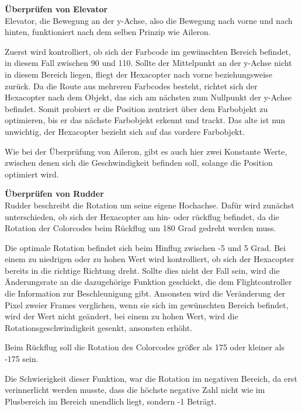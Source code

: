     \textbf{Überprüfen von Elevator}\\
    Elevator, die Bewegung an der y-Achse, also die Bewegung nach vorne und nach hinten, funktioniert nach dem selben Prinzip wie Aileron. 

    Zuerst wird kontrolliert, ob sich der Farbcode im gewünschten Bereich befindet, in diesem Fall zwischen 90 und 110.
    Sollte der Mittelpunkt an der y-Achse nicht in diesem Bereich liegen, fliegt der Hexacopter nach vorne beziehungsweise zurück.
    Da die Route aus mehreren Farbcodes besteht, richtet sich der Hexacopter nach dem Objekt, das sich am nächsten zum Nullpunkt der y-Achse befindet. Somit probiert er die Position zentriert über dem Farbobjekt zu optimieren, bis er das nächste Farbobjekt erkennt und trackt. Das alte ist nun unwichtig, der Hexacopter bezieht sich auf das vordere Farbobjekt.

    Wie bei der Überprüfung von Aileron, gibt es auch hier zwei Konstante Werte, zwischen denen sich die Geschwindigkeit befinden soll, solange die Position optimiert wird.

    \textbf{Überprüfen von Rudder}\\
    Rudder beschreibt die Rotation um seine eigene Hochachse. Dafür wird zunächst unterschieden, ob sich der Hexacopter am hin- oder rückflug befindet, da die Rotation der Colorcodes beim Rückflug um 180 Grad gedreht werden muss.

    Die optimale Rotation befindet sich beim Hinflug zwischen -5 und 5 Grad. 
    Bei einem zu niedrigen oder zu hohen Wert wird kontrolliert, ob sich der Hexacopter bereits in die richtige Richtung dreht. 
    Sollte dies nicht der Fall sein, wird die Änderungsrate an die dazugehörige Funktion geschickt, die dem Flightcontroller die Information zur Beschleunigung gibt. 
    Ansonsten wird die Veränderung der Pixel zweier Frames verglichen, wenn sie sich im gewünschten Bereich befindet, wird der Wert nicht geändert, bei einem zu hohen Wert, wird die Rotationsgeschwindigkeit gesenkt, ansonsten erhöht.

    Beim Rückflug soll die Rotation des Colorcodes größer als 175 oder kleiner als -175 sein. 

    Die Schwierigkeit dieser Funktion, war die Rotation im negativen Bereich, da erst verinnerlicht werden musste, dass die höchste negative Zahl nicht wie im Plusbereich im Bereich unendlich liegt, sondern -1 Beträgt.


